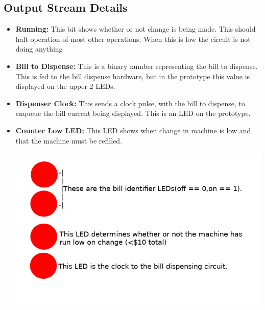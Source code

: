 \subsection{Output Stream Details}
\begin{itemize}
\item{\textbf{Running:} This bit shows whether or not change is being made.
This should halt operation of most other operations. When this is low the
circuit is not doing anything}
\item{\textbf{Bill to Dispense:} This is a binary number representing the
bill to dispense. This is fed to the bill dispense hardware, but in the
prototype this value is displayed on the upper 2 LEDs.}
\item{\textbf{Dispenser Clock:} This sends a clock pulse, with the bill to
dispense, to enqueue the bill current being displayed. This is an LED on
the prototype.}
\item{\textbf{Counter Low LED:} This LED shows when change in machine is low and that the machine must be refilled.}


\includegraphics[scale=0.5]{images/LEDs}
\end{itemize}

